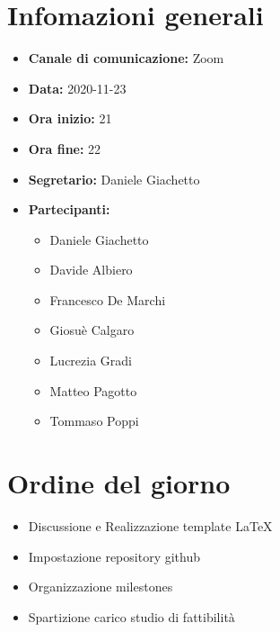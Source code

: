 \section{Infomazioni generali}

\begin{itemize}

	\item \textbf{Canale di comunicazione:} Zoom
	
	\item \textbf{Data:} 2020-11-23
	
	\item \textbf{Ora inizio:} 21
	
	\item \textbf{Ora fine:} 22
	
	\item \textbf{Segretario:} Daniele Giachetto
	
	\item \textbf{Partecipanti:}
	
		\begin{itemize}
		
			\item Daniele Giachetto
			\item Davide Albiero
			\item Francesco De Marchi
			\item Giosuè Calgaro
			\item Lucrezia Gradi
			\item Matteo Pagotto
			\item Tommaso Poppi
				 
		\end{itemize}

\end{itemize}

\section{Ordine del giorno}

\begin{itemize}

	\item Discussione e Realizzazione template \LaTeX

	\item Impostazione repository github

	\item Organizzazione milestones

	\item Spartizione carico studio di fattibilità

\end{itemize}

